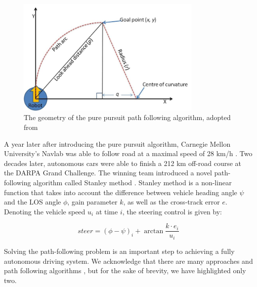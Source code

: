 \documentclass{ctuthesis/ctuthesis}
\begin{document}
\begin{figure}[]
    \centering
    \includegraphics[width=0.8\textwidth]{images/Geometry-of-the-pure-pursuit-algorithm.jpg}
    
    \caption[The geometry of the pure pursuit path following algorithm]{The geometry of the pure pursuit path following algorithm, adopted from \protect\cite{nice_picture}}\label{f:pure_pursuit}
\end{figure}


A year later after introducing the pure pursuit algorithm, Carnegie Mellon University's Navlab was able to follow road at a maximal speed of 28 km/h \cite{navlab1}. Two decades later, autonomous cars were able to finish a 212 km off-road course at the DARPA Grand Challenge. The winning team introduced a novel path-following algorithm called Stanley method \cite{stanley_method}. Stanley method is a non-linear function that takes into account the difference between vehicle heading angle $\psi$ and the LOS angle $\phi$, gain parameter $k$, as well as the cross-track error $e$. Denoting the vehicle speed $u_i$ at time $i$, the steering control is given by:

\begin{equation}
steer = (\phi- \psi)_i + \arctan{\dfrac{k\cdot e_i}{u_i}}
\end{equation}


Solving the path-following problem is an important step to achieving a fully autonomous driving system. We acknowledge that there are many approaches and path following algorithms \cite{path_following_overview}, but for the sake of brevity, we have highlighted only two.
\end{document}
